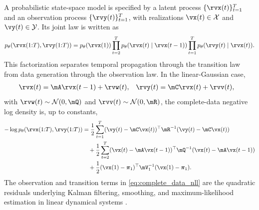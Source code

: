 \documentclass[twoside,11pt]{article}
\begin{document}
A probabilistic state-space model is specified by a latent process
$\{\rvx(t)\}_{t=1}^T$ and an observation process
$\{\rvy(t)\}_{t=1}^T$, with realizations
$\vx(t)\in\mathcal X$ and $\vy(t)\in\mathcal Y$. Its joint law is written as
\begin{align}
p_\theta(\rvx(1{:}T),\rvy(1{:}T))
=
p_\theta(\rvx(1))
\prod_{t=2}^T p_\theta(\rvx(t)\mid \rvx(t-1))
\prod_{t=1}^T p_\theta(\rvy(t)\mid \rvx(t)).
\label{eq:ssm_factorization}
\end{align}
This factorization separates temporal propagation through the transition law from data generation through the observation law. In the linear-Gaussian case,
\begin{align}
\rvx(t)
&=
\mA \rvx(t-1) + \rvw(t),
&
\rvy(t)
&=
\mC \rvx(t) + \rvv(t),
\label{eq:linear_gaussian_ssm}
\end{align}
with $\rvw(t)\sim\mathcal N(0,\mQ)$ and $\rvv(t)\sim\mathcal N(0,\mR)$, the complete-data negative log density is, up to constants,
\begin{align}
-\log p_\theta(\rvx(1{:}T),\rvy(1{:}T))
&=
\frac{1}{2}
\sum_{t=1}^T
(\vy(t)-\mC \vx(t))^\top \mR^{-1}(\vy(t)-\mC \vx(t))
\nonumber\\
&\quad+
\frac{1}{2}
\sum_{t=2}^T
(\vx(t)-\mA \vx(t-1))^\top \mQ^{-1}(\vx(t)-\mA \vx(t-1))
\nonumber\\
&\quad+
\frac{1}{2}
(\vx(1)-\bm{\pi}_1)^\top \mV_1^{-1}(\vx(1)-\bm{\pi}_1).
\label{eq:complete_data_nll}
\end{align}
The observation and transition terms in \eqref{eq:complete_data_nll} are the quadratic residuals underlying Kalman filtering, smoothing, and maximum-likelihood estimation in linear dynamical systems \citep{katayama2005subspace}.
\end{document}
